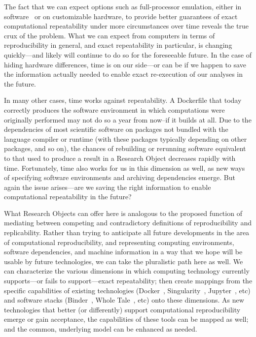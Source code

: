 The fact that we can expect options such as full-processor emulation, either in software~\cite{QEMU}
	or on customizable hardware,
	to provide better guarantees of exact computational repeatability under more circumstances
	over time reveals the true crux of the problem.
What we can expect from computers in terms of reproducibility in general, and exact
	repeatability in particular, is changing quickly---and likely will continue to do so for the
	foreseeable future.
In the case of hiding hardware differences, time is on our side---or can be if we happen to save the
	information actually needed to enable exact re-execution of our analyses in the future.

In many other cases, time works against repeatability.
A Dockerfile that today correctly produces the software environment in which computations were originally
	performed may not do so a year from now--if it builds at all.
Due to the dependencies of most scientific software on packages not
	bundled with the language compiler or runtime (with these packages typically depending on
	other packages, and so on), the chances of rebuilding or rerunning software
	equivalent to that used to produce a result in a Research Object decreases
	rapidly with time.
Fortunately, time also works for us in this dimension as well, as new ways of specifying software
	environments and archiving dependencies emerge.
But again the issue arises---are we saving the right information to enable computational repeatability
	in the future?

What Research Objects can offer here is analogous to the proposed function of mediating between competing
	and contradictory definitions of reproducibility and replicability.
Rather than trying to anticipate all future developments in the area of computational reproducibility,
	and representing computing environments, software dependencies, and machine information
	in a way that we hope will be usable by future technologies, we can take the pluralistic
	path here as well.
We can characterize the various dimensions in which computing technology currently supports---or fails to
	support---exact repeatability; then create mappings from the specific capabilities
	of existing technologies (Docker~\cite{docker2019}, Singularity~\cite{Singularity2019}, Jupyter~\cite{jupyter2019}, etc)
	and software stacks (Binder~\cite{Binder_2018}, Whole Tale~\cite{WT2019}, etc)
	onto these dimensions.
As new technologies that better (or differently) support computational reproducibility emerge or gain acceptance,
	the capabilities of these tools can be mapped as well; and the common, underlying model can be enhanced as needed.


